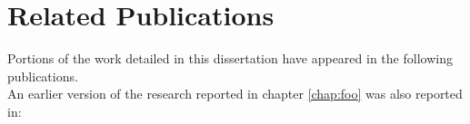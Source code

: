\chapter*{Related Publications}

Portions of the work detailed in this dissertation have appeared in
the following publications. \\[1ex]

\noindent An earlier version of the research reported in chapter
\ref{chap:foo} was also reported in:

 \\[1ex]
